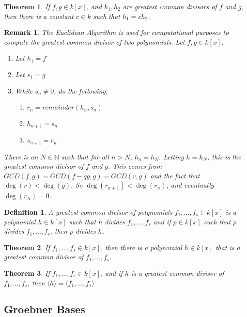 \documentclass[oneside]{book}
\theoremstyle{mystyle}
\newtheorem{theorem}{Theorem}[section]
\newtheorem{definition}{Definition}[section]
\newtheorem{remark}{Remark}[section]
\begin{document}
\begin{theorem}
If $f,g\in k[x]$, and $h_1,h_2$ are greatest common divisors of $f$ and $g$, then there is a constant $c\in k$ such that $h_1 = ch_2$.
\end{theorem}
\begin{remark}
The Euclidean Algorithm is used for computational purposes to compute the greatest common divisor of two polynomials. Let $f,g\in k[x]$.
\begin{enumerate}
    \item Let $h_1 = f$
    \item Let $s_1 = g$
    \item While $s_n \ne 0$, do the following:
    \begin{enumerate}
        \item $r_n = remainder(h_n,s_n)$
        \item $h_{n+1} = s_n$
        \item $s_{n+1} = r_n$
    \end{enumerate}
\end{enumerate}
There is an $N\in \mathbb{N}$ such that for all $n>N$, $h_n = h_N$. Letting $h = h_N$, this is the greatest common divisor of $f$ and $g$. This comes from $GCD(f,g) = GCD(f-qg,g) = GCD(r,g)$ and the fact that $\deg(r)< \deg(g)$. So $\deg(r_{n+1})<\deg(r_n)$, and eventually $\deg(r_N) = 0$.
\end{remark}
\begin{definition}
A greatest common divisor of polynomials $f_1,\hdots, f_s \in k[x]$ is a polynomial $h\in k[x]$ such that $h$ divides $f_1,\hdots, f_s$ and if $p\in k[x]$ such that $p$ divides $f_1,\hdots, f_s$, then $p$ divides $h$.
\end{definition}
\begin{theorem}
If $f_1,\hdots, f_s\in k[x]$, then there is a polynomial $h\in k[x]$ that is a greatest common divisor of $f_1,\hdots, f_s$.
\end{theorem}
\begin{theorem}
If $f_1,\hdots, f_s\in k[x]$, and if $h$ is a greatest common divisor of $f_1,\hdots, f_s$, then $\langle h \rangle = \langle f_1,\hdots, f_s\rangle$
\end{theorem}
\subsection{Groebner Bases}
\end{document}
